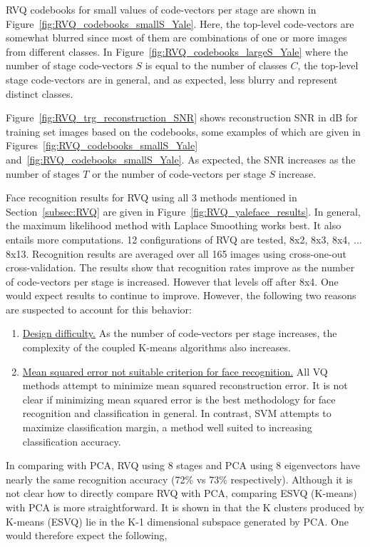 \begin{Body}
RVQ codebooks for small values of code-vectors per stage are shown in Figure~\ref{fig:RVQ_codebooks_smallS_Yale}.  Here, the top-level code-vectors are somewhat blurred since most of them are combinations of one or more images from different classes.   In Figure~\ref{fig:RVQ_codebooks_largeS_Yale} where the number of stage code-vectors $S$ is equal to the number of classes $C$, the top-level stage code-vectors are in general, and as expected, less blurry and represent distinct classes.

Figure~\ref{fig:RVQ_trg_reconstruction_SNR} shows reconstruction SNR in dB for training set images based on the codebooks, some examples of which are given in Figures~\ref{fig:RVQ_codebooks_smallS_Yale} and~\ref{fig:RVQ_codebooks_smallS_Yale}.  As expected, the SNR increases as the number of stages $T$ or the number of code-vectors per stage $S$ increase.

Face recognition results for RVQ using all 3 methods mentioned in Section~\ref{subsec:RVQ} are given in Figure~\ref{fig:RVQ_yaleface_results}.  In general, the maximum likelihood method with Laplace Smoothing works best.  It also entails more computations.  12 configurations of RVQ are tested, 8x2, 8x3, 8x4, $\ldots$ 8x13.  Recognition results are averaged over all 165 images using cross-one-out cross-validation.  The results show that recognition rates improve as the number of code-vectors per stage is increased.  However that levels off after 8x4.  One would expect results to continue to improve.  However, the following two reasons are suspected to account for this behavior:

\begin{enumerate}
\item \underline{Design difficulty.}  As the number of code-vectors per stage increases, the complexity of the coupled K-means algorithms also increases.
\item \underline{Mean squared error not suitable criterion for face recognition.}  All VQ methods attempt to minimize mean squared reconstruction error.  It is not clear if minimizing mean squared error is the best methodology for face recognition and classification in general.  In contrast, SVM attempts to maximize classification margin, a method well suited to increasing classification accuracy.
\end{enumerate}

In comparing with PCA, RVQ using 8 stages and PCA using 8 eigenvectors have nearly the same recognition accuracy (72\% vs 73\% respectively).  Although it is not clear how to directly compare RVQ with PCA, comparing ESVQ (K-means) with PCA is more straightforward.  It is shown in \cite{2004_CNF_KmeansVsPCA_DingHe} that the K clusters produced by K-means (ESVQ) lie in the K-1 dimensional subspace generated by PCA.  One would therefore expect the following,


\end{Body}
